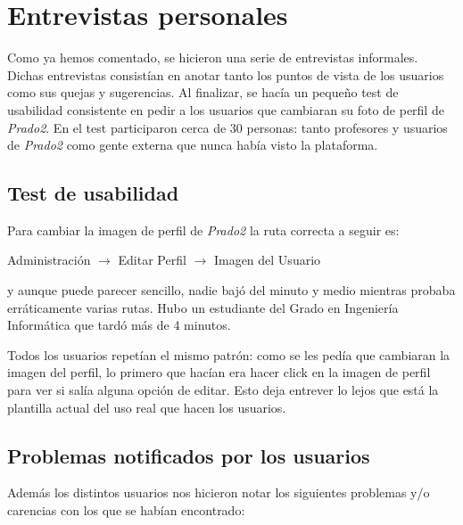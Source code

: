 \section{Entrevistas personales}

Como ya hemos comentado, se hicieron una serie de entrevistas informales. Dichas entrevistas consistían en anotar tanto los puntos de vista de los usuarios como sus quejas y sugerencias. Al finalizar, se hacía un pequeño test de usabilidad consistente en pedir a los usuarios que cambiaran su foto de perfil de \textit{Prado2}. En el test participaron cerca de 30 personas: tanto profesores y usuarios de \textit{Prado2} como gente externa que nunca había visto la plataforma.

\subsection{Test de usabilidad}

Para cambiar la imagen de perfil de \textit{Prado2} la ruta correcta a seguir es:

\begin{center}
Administración $\rightarrow$ Editar Perfil $\rightarrow$ Imagen del Usuario
\end{center}

y aunque puede parecer sencillo, nadie bajó del minuto y medio mientras probaba erráticamente varias rutas. Hubo un estudiante del Grado en Ingeniería Informática que tardó más de 4 minutos.

\bigskip
Todos los usuarios repetían el mismo patrón: como se les pedía que cambiaran la imagen del perfil, lo primero que hacían era hacer click en la imagen de perfil para ver si salía alguna opción de editar. Esto deja entrever lo lejos que está la plantilla actual del uso real que hacen los usuarios.

\subsection{Problemas notificados por los usuarios}
Además los distintos usuarios nos hicieron notar los siguientes problemas y/o carencias con los que se habían encontrado:

